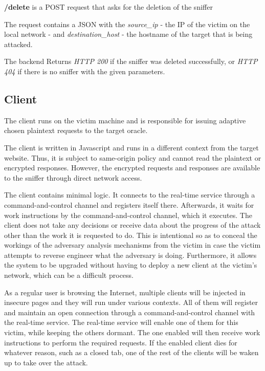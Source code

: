 \textbf{/delete} is a POST request that asks for the deletion of the sniffer

The request contains a JSON with the \textit{source\_ip} - the IP of the victim on the local network - 
and \textit{destination\_host} - the hostname of the target that is being attacked.

The backend Returns \textit{HTTP 200} if the sniffer was deleted successfully, or \textit{HTTP 404} if 
there is no sniffer with the given parameters.

\subsection{Client}

The client runs on the victim machine and is responsible for issuing adaptive
chosen plaintext requests to the target oracle.

The client is written in Javascript and runs in a different context from the
target website. Thus, it is subject to same-origin policy and cannot read the
plaintext or encrypted responses. However, the encrypted requests and responses
are available to the sniffer through direct network access.

The client contains minimal logic. It connects to the real-time service through
a command-and-control channel and registers itself there. Afterwards, it waits
for work instructions by the command-and-control channel, which it executes.
The client does not take any decisions or receive data about the progress of
the attack other than the work it is requested to do. This is intentional so as
to conceal the workings of the adversary analysis mechanisms from the victim in
case the victim attempts to reverse engineer what the adversary is doing.
Furthermore, it allows the system to be upgraded without having to deploy a new
client at the victim's network, which can be a difficult process.

As a regular user is browsing the Internet, multiple clients will be injected
in insecure pages and they will run under various contexts. All of them will
register and maintain an open connection through a command-and-control channel
with the real-time service. The real-time service will enable one of them for
this victim, while keeping the others dormant. The one enabled will then
receive work instructions to perform the required requests. If the enabled
client dies for whatever reason, such as a closed tab, one of the rest of the
clients will be waken up to take over the attack.

